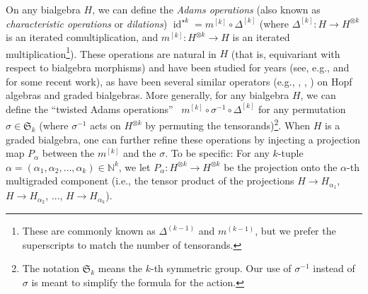 \documentclass[numbers=enddot,12pt,final,onecolumn,notitlepage]{scrartcl}%
\theoremstyle{definition}
\begin{document}
On any bialgebra $H$, we can define the \textit{Adams operations} (also known
as \textit{characteristic operations} or \textit{dilations})
$\operatorname*{id}\nolimits^{\star k}=m^{\left[  k\right]  }\circ
\Delta^{\left[  k\right]  }$ (where $\Delta^{\left[  k\right]  }:H\rightarrow
H^{\otimes k}$ is an iterated comultiplication, and $m^{\left[  k\right]
}:H^{\otimes k}\rightarrow H$ is an iterated multiplication\footnote{These are
commonly known as $\Delta^{\left(  k-1\right)  }$ and $m^{\left(  k-1\right)
}$, but we prefer the superscripts to match the number of tensorands.}). These
operations are natural in $H$ (that is, equivariant with respect to bialgebra
morphisms) and have been studied for years (see, e.g., \cite{Kashin19} and
\cite{AguLau14} for some recent work), as have been several similar operators
(e.g., \cite{Patras94}, \cite[\S 4.5]{Loday98}, \cite{PatReu98}) on Hopf
algebras and graded bialgebras. More generally, for any bialgebra $H$, we can
define the \textquotedblleft twisted Adams operations\textquotedblright%
\ $m^{\left[  k\right]  }\circ\sigma^{-1}\circ\Delta^{\left[  k\right]  }$ for
any permutation $\sigma\in\mathfrak{S}_{k}$ (where $\sigma^{-1}$ acts on
$H^{\otimes k}$ by permuting the tensorands)\footnote{The notation
$\mathfrak{S}_{k}$ means the $k$-th symmetric group. Our use of $\sigma^{-1}$
instead of $\sigma$ is meant to simplify the formula for the action.}. When
$H$ is a graded bialgebra, one can further refine these operations by
injecting a projection map $P_{\alpha}$ between the $m^{\left[  k\right]  }$
and the $\sigma$. To be specific: For any $k$-tuple $\alpha=\left(  \alpha
_{1},\alpha_{2},\ldots,\alpha_{k}\right)  \in\mathbb{N}^{k}$, we let
$P_{\alpha}:H^{\otimes k}\rightarrow H^{\otimes k}$ be the projection onto the
$\alpha$-th multigraded component (i.e., the tensor product of the projections
$H\rightarrow H_{\alpha_{1}}$, $H\rightarrow H_{\alpha_{2}}$, $\ldots$,
$H\rightarrow H_{\alpha_{k}}$).
\end{document}
